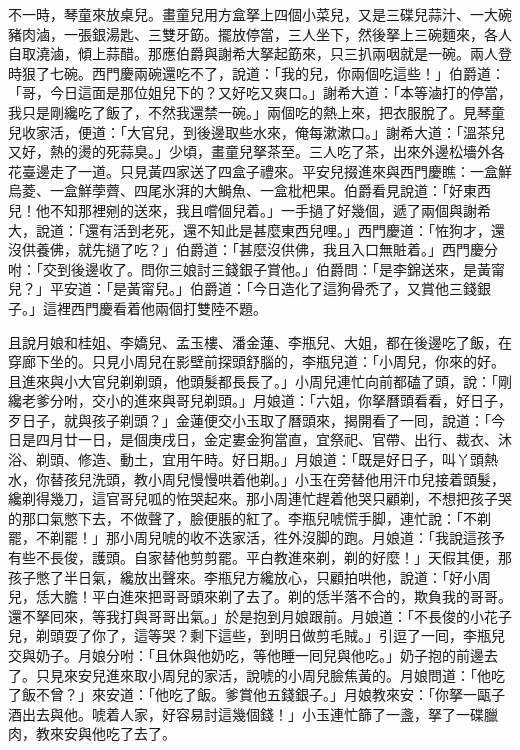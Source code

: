 不一時，琴童來放桌兒。畫童兒用方盒拏上四個小菜兒，又是三碟兒蒜汁、一大碗豬肉滷，一張銀湯匙、三雙牙筯。擺放停當，三人坐下，然後拏上三碗麵來，各人自取澆滷，傾上蒜醋。那應伯爵與謝希大拏起筯來，只三扒兩咽就是一碗。兩人登時狠了七碗。西門慶兩碗還吃不了，說道：「我的兒，你兩個吃這些！」伯爵道：「哥，今日這面是那位姐兒下的？又好吃又爽口。」謝希大道：「本等滷打的停當，我只是剛纔吃了飯了，不然我還禁一碗。」兩個吃的熱上來，把衣服脫了。見琴童兒收家活，便道：「大官兒，到後邊取些水來，俺每漱漱口。」謝希大道：「溫茶兒又好，熱的燙的死蒜臭。」少頃，畫童兒拏茶至。三人吃了茶，出來外邊松墻外各花臺邊走了一道。只見黃四家送了四盒子禮來。平安兒掇進來與西門慶瞧：一盒鮮烏菱、一盒鮮荸薺、四尾氷湃的大鰣魚、一盒枇杷果。伯爵看見說道：「好東西兒！他不知那裡剜的送來，我且嚐個兒着。」一手撾了好幾個，遞了兩個與謝希大，說道：「還有活到老死，還不知此是甚麼東西兒哩。」西門慶道：「恠狗才，還沒供養佛，就先撾了吃？」伯爵道：「甚麼沒供佛，我且入口無賍着。」西門慶分咐：「交到後邊收了。問你三娘討三錢銀子賞他。」伯爵問：「是李錦送來，是黃甯兒？」平安道：「是黃甯兒。」伯爵道：「今日造化了這狗骨禿了，又賞他三錢銀子。」{}這裡西門慶看着他兩個打雙陸不題。

且說月娘和桂姐、李嬌兒、孟玉樓、潘金蓮、李瓶兒、大姐，都在後邊吃了飯，在穿廊下坐的。只見小周兒在影壁前探頭舒腦的，李瓶兒道：「小周兒，你來的好。且進來與小大官兒剃剃頭，他頭髮都長長了。」小周兒連忙向前都磕了頭，說：「剛纔老爹分咐，交小的進來與哥兒剃頭。」月娘道：「六姐，你拏曆頭看看，好日子，歹日子，就與孩子剃頭？」金蓮便交小玉取了曆頭來，揭開看了一囘，說道：「今日是四月廿一日，是個庚戌日，金定婁金狗當直，宜祭祀、官帶、出行、裁衣、沐浴、剃頭、修造、動土，宜用午時。好日期。」月娘道：「既是好日子，叫丫頭熱水，你替孩兒洗頭，教小周兒慢慢哄着他剃。」{}小玉在旁替他用汗巾兒接着頭髮，纔剃得幾刀，這官哥兒呱的恠哭起來。那小周連忙趕着他哭只顧剃，不想把孩子哭的那口氣憋下去，不做聲了，臉便脹的紅了。李瓶兒唬慌手脚，連忙說：「不剃罷，不剃罷！」那小周兒唬的收不迭家活，徃外沒脚的跑。月娘道：「我說這孩予有些不長俊，護頭。自家替他剪剪罷。平白教進來剃，剃的好麼！」天假其便，那孩子憋了半日氣，纔放出聲來。李瓶兒方纔放心，只顧拍哄他，說道：「好小周兒，恁大膽！平白進來把哥哥頭來剃了去了。剃的恁半落不合的，欺負我的哥哥。還不拏囘來，等我打與哥哥出氣。」{}於是抱到月娘跟前。月娘道：「不長俊的小花子兒，剃頭耍了你了，這等哭？剩下這些，到明日做剪毛賊。」引逗了一囘，李瓶兒交與奶子。月娘分咐：「且休與他奶吃，等他睡一囘兒與他吃。」奶子抱的前邊去了。只見來安兒進來取小周兒的家活，說唬的小周兒臉焦黃的。月娘問道：「他吃了飯不曾？」來安道：「他吃了飯。爹賞他五錢銀子。」月娘教來安：「你拏一甌子酒出去與他。唬着人家，好容易討這幾個錢！」小玉連忙篩了一盞，拏了一碟臘肉，教來安與他吃了去了。

